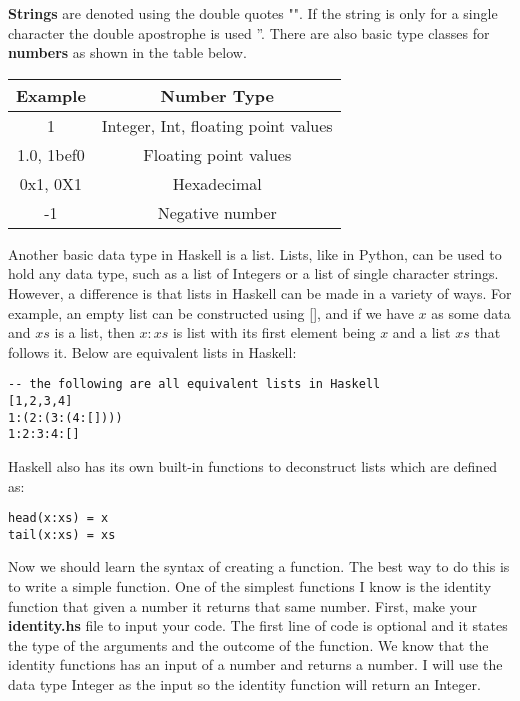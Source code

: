 \documentclass{article}
\begin{document}
\textbf{Strings} are denoted using the double quotes "". If the string is only for a single character the double apostrophe is used ''. There are also basic type classes for \textbf{numbers} as shown in the table below.
\begin{table}[h!]
\centering
 \begin{tabular}{||c c||} 
 \hline
 Example & Number Type\\ [0.5ex] 
 \hline\hline
 1 & Integer, Int, floating point values  \\ 
 1.0, 1bef0 & Floating point values \\
 0x1, 0X1 & Hexadecimal \\
 -1 & Negative number  \\  [1ex] 
 \hline
 \end{tabular}
\end{table}

Another basic data type in Haskell is a list. Lists, like in Python, can be used to hold any data type, such as a list of Integers or a list of single character strings. However, a difference is that lists in Haskell can be made in a variety of ways. For example, an empty list can be constructed using [], and if we have $x$ as some data and $xs$ is a list, then $x:xs$ is list with its first element being $x$ and a list $xs$ that follows it. Below are equivalent lists in Haskell:
\begin{lstlisting}
-- the following are all equivalent lists in Haskell
[1,2,3,4]
1:(2:(3:(4:[])))
1:2:3:4:[]
\end{lstlisting}
Haskell also has its own built-in functions to deconstruct lists which are defined as:
\begin{lstlisting}
head(x:xs) = x
tail(x:xs) = xs
\end{lstlisting}

Now we should learn the syntax of creating a function. The best way to do this is to write a simple function. One of the simplest functions I know is the identity function that given a number it returns that same number. First, make your \textbf{identity.hs} file to input your code. The first line of code is optional and it states the type of the arguments and the outcome of the function. We know that the identity functions has an input of a number and returns a number. I will use the data type Integer as the input so the identity function will return an Integer. 
\end{document}
